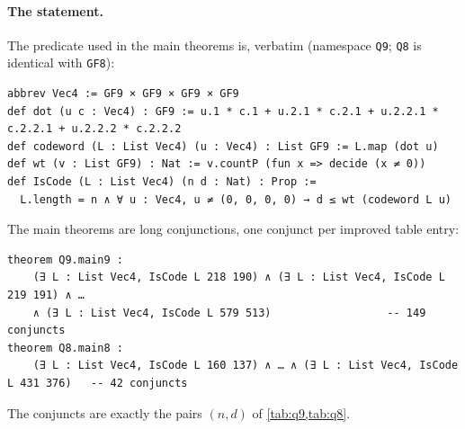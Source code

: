 \documentclass[11pt]{article}
\numberwithin{equation}{section}
\theoremstyle{definition}
\theoremstyle{remark}
\begin{document}
\paragraph{The statement.} The predicate used in the main theorems is, verbatim (namespace \texttt{Q9};
\texttt{Q8} is identical with \texttt{GF8}):
\begin{lstlisting}
abbrev Vec4 := GF9 × GF9 × GF9 × GF9
def dot (u c : Vec4) : GF9 := u.1 * c.1 + u.2.1 * c.2.1 + u.2.2.1 * c.2.2.1 + u.2.2.2 * c.2.2.2
def codeword (L : List Vec4) (u : Vec4) : List GF9 := L.map (dot u)
def wt (v : List GF9) : Nat := v.countP (fun x => decide (x ≠ 0))
def IsCode (L : List Vec4) (n d : Nat) : Prop :=
  L.length = n ∧ ∀ u : Vec4, u ≠ (0, 0, 0, 0) → d ≤ wt (codeword L u)
\end{lstlisting}
The main theorems are long conjunctions, one conjunct per improved table entry:
\begin{lstlisting}
theorem Q9.main9 :
    (∃ L : List Vec4, IsCode L 218 190) ∧ (∃ L : List Vec4, IsCode L 219 191) ∧ …
    ∧ (∃ L : List Vec4, IsCode L 579 513)                  -- 149 conjuncts
theorem Q8.main8 :
    (∃ L : List Vec4, IsCode L 160 137) ∧ … ∧ (∃ L : List Vec4, IsCode L 431 376)   -- 42 conjuncts
\end{lstlisting}
The conjuncts are exactly the pairs $(n,d)$ of \cref{tab:q9,tab:q8}.
\end{document}

